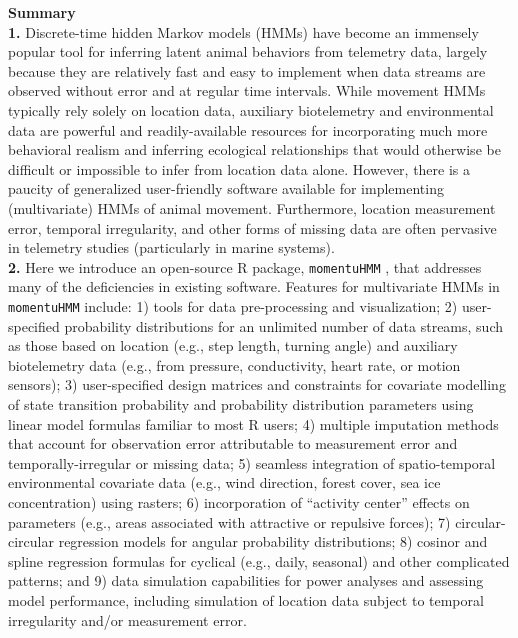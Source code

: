 \documentclass[12pt]{article}
\begin{document}
\noindent \textbf{Summary}\\
\textbf{1.} Discrete-time hidden Markov models (HMMs) have become an immensely popular tool for inferring latent animal behaviors from telemetry data, largely because they are relatively fast and easy to implement when data streams are observed without error and at regular time intervals. While movement HMMs typically rely solely on location data, auxiliary biotelemetry and environmental data are powerful and readily-available resources for incorporating much more behavioral realism and inferring ecological relationships that would otherwise be difficult or impossible to infer from location data alone.  However, there is a paucity of generalized user-friendly software available for implementing (multivariate) HMMs of animal movement. Furthermore, location measurement error, temporal irregularity, and other forms of missing data are often pervasive in telemetry studies (particularly in marine systems).\\ %
\textbf{2.} Here we introduce an open-source R package, \verb|momentuHMM| %
, that addresses many of the deficiencies in existing software.  Features for multivariate HMMs in \verb|momentuHMM| include: 1) tools for data pre-processing and visualization; 2) user-specified probability distributions for an unlimited number of data streams, such as those based on location (e.g., step length, turning angle) and auxiliary biotelemetry data (e.g., from pressure, conductivity, heart rate, or motion sensors); 3) user-specified design matrices and constraints for covariate modelling of state transition probability and probability distribution parameters using linear model formulas familiar to most R users; 4) multiple imputation methods that account for observation error attributable to measurement error and temporally-irregular or missing data; 5) seamless integration of spatio-temporal environmental covariate data (e.g., wind direction, forest cover, sea ice concentration) using rasters; 6) incorporation of ``activity center'' effects on parameters (e.g., areas associated with attractive or repulsive forces); 7) circular-circular regression models for angular probability distributions; 8) cosinor and spline regression formulas for cyclical (e.g., daily, seasonal) and other complicated patterns; and 9) data simulation capabilities for power analyses and assessing model performance, including simulation of location data subject to temporal irregularity and/or measurement error.\\ 
\end{document}
